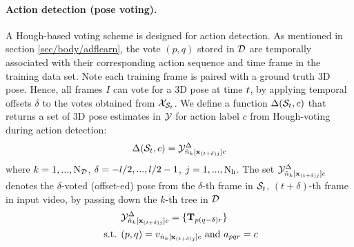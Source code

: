 \paragraph{Action detection (pose voting).}
A Hough-based voting scheme is designed for action detection. 
As mentioned in section \ref{sec/body/adflearn}, the vote $(p,q)$ stored in $\mathcal{D}$ are temporally associated with their corresponding action sequence and time frame in the training data set. Note each training frame is paired with a ground truth 3D pose. Hence, all frames $I$ can vote for a 3D pose at time $t$, by applying temporal offsets  $\delta$ to the votes obtained from $\mathcal{X}_{\mathcal{S}_{t}}$. We define a function $\Delta(\mathcal{S}_{t},c)$ that returns a set of 3D pose estimates in $\mathcal{Y}$ for action label $c$ from Hough-voting during action detection: 
\begin{equation}
	\Delta(\mathcal{S}_{t}, c) = \mathcal{Y}^{\Delta}_{{\hat{n}}_{k}[\mathbf{x}_{(t+\delta)j}]c}
\end{equation}
where $ k = 1,...,\mathrm{N_{\mathcal{D}}}$, $\delta = -l/2,...,l/2-1$, $j = 1,...,\mathrm{N_{h}}$. The set $\mathcal{Y}^{\Delta}_{{\hat{n}}_{k}[\mathbf{x}_{(t+\delta)j}]c}$ denotes the $\delta$-voted (offset-ed) pose from the $\delta$-th frame in $\mathcal{S}_{t}$, \ie $(t\!+\!\delta)$-th frame in input video, by passing down the $k$-th tree in $\mathcal{D}$
\begin{equation}
	\begin{split}
		& \mathcal{Y}^{\Delta}_{{\hat{n}}_{k}[\mathbf{x}_{(t+\delta)j}]c} = \{\mathbf{T}_{p(q-\delta)r}\}\\ 
		\mbox{ s.t. } & (p,q) = v_{{\hat{n}}_{k}[\mathbf{x}_{(t+\delta)j}]c} \mbox{ and } a_{pqr} = c 
\end{split} 
\end{equation} 

